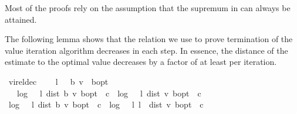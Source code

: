 \begin{isabellebody}
\begin{isamarkuptext}
Most of the proofs rely on the assumption that the supremum in  can always be attained.%
\end{isamarkuptext}\isamarkuptrue%
%
\begin{isamarkuptext}%
The following lemma shows that the relation we use to prove termination of the value iteration 
algorithm decreases in each step.
In essence, the distance of the estimate to the optimal value decreases by a factor of at 
least  per iteration.%
\end{isamarkuptext}\isamarkuptrue%
\isamarkupfalse%
\ vi{\isacharunderscore}{\kern0pt}rel{\isacharunderscore}{\kern0pt}dec{\isacharcolon}{\kern0pt}\ \isanewline
\ \ \ {\isachardoublequoteopen}l\ {\isasymnoteq}\ {}{\isachardoublequoteclose}\ {\isachardoublequoteopen}{\isasymL}\isactrlsub b\ v\ {\isasymnoteq}\ {\isasymnu}\isactrlsub b{\isacharunderscore}{\kern0pt}opt{\isachardoublequoteclose}\isanewline
\ \ \ {\isachardoublequoteopen}{\isasymlceil}log\ {\isacharparenleft}{\kern0pt}{}\ {\isacharslash}{\kern0pt}\ l{\isacharparenright}{\kern0pt}\ {\isacharparenleft}{\kern0pt}dist\ {\isacharparenleft}{\kern0pt}{\isasymL}\isactrlsub b\ v{\isacharparenright}{\kern0pt}\ {\isasymnu}\isactrlsub b{\isacharunderscore}{\kern0pt}opt{\isacharparenright}{\kern0pt}\ {\isacharminus}{\kern0pt}\ c{\isasymrceil}\ {\isacharless}{\kern0pt}\ {\isasymlceil}log\ {\isacharparenleft}{\kern0pt}{}\ {\isacharslash}{\kern0pt}\ l{\isacharparenright}{\kern0pt}\ {\isacharparenleft}{\kern0pt}dist\ v\ {\isasymnu}\isactrlsub b{\isacharunderscore}{\kern0pt}opt{\isacharparenright}{\kern0pt}\ {\isacharminus}{\kern0pt}\ c{\isasymrceil}{\isachardoublequoteclose}\isanewline
%
\isadelimproof
%
\endisadelimproof
%
\isatagproof
{}\isamarkupfalse%
\ {\isacharminus}{\kern0pt}\isanewline
\ \ \isamarkupfalse%
\ {\isachardoublequoteopen}log\ {\isacharparenleft}{\kern0pt}{}\ {\isacharslash}{\kern0pt}\ l{\isacharparenright}{\kern0pt}\ {\isacharparenleft}{\kern0pt}dist\ {\isacharparenleft}{\kern0pt}{\isasymL}\isactrlsub b\ v{\isacharparenright}{\kern0pt}\ {\isasymnu}\isactrlsub b{\isacharunderscore}{\kern0pt}opt{\isacharparenright}{\kern0pt}\ {\isacharminus}{\kern0pt}\ c\ {\isasymle}\ log\ {\isacharparenleft}{\kern0pt}{}\ {\isacharslash}{\kern0pt}\ l{\isacharparenright}{\kern0pt}\ {\isacharparenleft}{\kern0pt}l\ {\isacharasterisk}{\kern0pt}\ dist\ v\ {\isasymnu}\isactrlsub b{\isacharunderscore}{\kern0pt}opt{\isacharparenright}{\kern0pt}\ {\isacharminus}{\kern0pt}\ c{\isachardoublequoteclose}\isanewline

\end{isabellebody}
